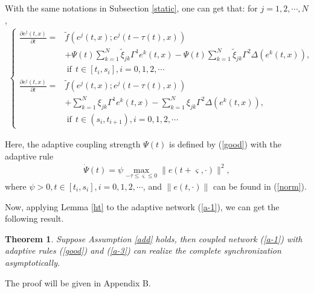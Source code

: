 \documentclass[review]{elsarticle}
\newtheorem{thm}{Theorem}
\begin{document}
With the same notations in Subsection \ref{static}, one can get that: for $j=1,2,\cdots,N$,
\begin{align}\label{a-2}
\left\{
\begin{array}{cl}
\frac{\partial{e^j(t,x)}}{\partial{t}}=&\tilde{f}(e^j(t,x);e^j(t-\tau(t),x))\\
&+\Psi(t)\sum\limits_{k=1}^N\tilde{\xi}_{jk}\Gamma^1
e^k(t,x)-\Psi(t)\sum\limits_{k=1}^N\tilde{\xi}_{jk}\Gamma^2
\Delta(e^k(t,x)),\\
&~\mathrm{if}~~t\in [t_i,s_i], i=0,1,2,\cdots\\
\frac{\partial{e^j(t,x)}}{\partial{t}}=&\tilde{f}(e^j(t,x);e^j(t-\tau(t),x))\\
&+\sum\limits_{k=1}^N\xi_{jk}\Gamma^1
e^k(t,x)-\sum\limits_{k=1}^N\xi_{jk}\Gamma^2
\Delta(e^k(t,x)),\\
&~\mathrm{if}~~t\in (s_i,t_{i+1}), i=0,1,2,\cdots
\end{array}
\right.
\end{align}

Here, the adaptive coupling strength $\Psi(t)$ is defined by (\ref{good}) with the adaptive rule
\begin{align}\label{a-3}
\dot{\Psi}(t)=\psi\max\limits_{-{\tau}\leq \varsigma\leq 0}\|e(t+\varsigma,\cdot)\|^2,
\end{align}
where $\psi>0, t\in [t_i, s_i], i=0,1,2,\cdots$, and $\|e(t,\cdot)\|$ can be found in (\ref{norm}).

Now, applying Lemma \ref{ht} to the adaptive network (\ref{a-1}), we can get the following result.
\begin{thm}\label{thm2}
Suppose Assumption \ref{add} holds, then coupled network (\ref{a-1}) with adaptive rules (\ref{good}) and (\ref{a-3}) can realize the complete synchronization asymptotically.
\end{thm}
The proof will be given in Appendix B.
\end{document}
